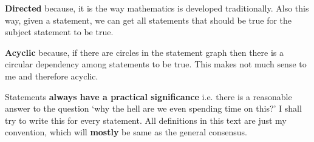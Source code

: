 \documentclass[./main.tex]{subfiles}
\begin{document}
\textbf{Directed} because, it is the way mathematics is developed traditionally. Also this way, given a statement, we can get all statements that should be true for the subject statement to be true.

\textbf{Acyclic} because, if there are circles in the statement graph then there is a circular dependency among statements to be true.
This makes not much sense to me and therefore acyclic.

Statements \textbf{always have a practical significance} i.e. there is a reasonable answer to the question `why the hell are we even spending time on this?' I shall try to write this for every statement. All definitions in this text are just my convention, which will \textbf{mostly} be same as the general consensus.
\end{document}
